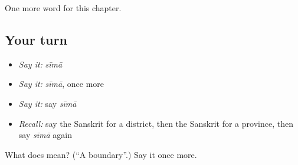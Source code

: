 \begin{grammarlens}[title={What you've built}]
One more word for this chapter.
\end{grammarlens}

\subsection*{Your turn}
\begin{itemize}
\raggedright
  \item \emph{Say it:} \emph{sīmā}
  \item \emph{Say it:} \emph{sīmā}, once more
  \item \emph{Say it:} say \emph{sīmā}
  \item \emph{Recall:} say the Sanskrit for a district, then the Sanskrit for a province, then say \emph{sīmā} again
\end{itemize}

\begin{tcolorbox}[breakable,colback=teal!4,colframe=teal!35!black,title={Before you move on}]
What does  mean? (\textquotedblleft{}A boundary\textquotedblright{}.) Say it once more.
\end{tcolorbox}
